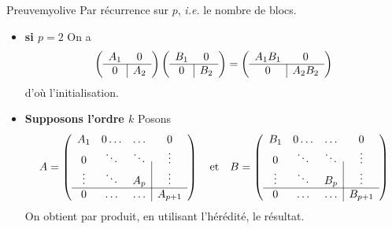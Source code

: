     \begin{demo}{Preuve}{myolive}
        Par récurrence sur $p$, \textit{i.e.} le nombre de blocs.
        \begin{itemize}
            \item \textbf{si $p = 2$} \quad On a 
            \[ \left( \begin{array}{c | c}
                A_1 & 0 \\
                \hline 
                0 & A_2
            \end{array} \right)\left( \begin{array}{c | c}
                B_1 & 0 \\
                \hline 
                0 & B_2
            \end{array} \right)  = \left( \begin{array}{c | c}
                A_1 B_1 & 0 \\
                \hline 
                0 & A_2 B_2
            \end{array} \right) \]   
            d’où l’initialisation.
            \item \textbf{Supposons l’ordre $k$} \quad Posons 
            \[ A =  \left( \begin{array}{c c c | c}
                A_1 & 0 \ldots & \ldots & 0 \\
                0 & \ddots & \ddots & \vdots \\
                \vdots & \ddots & A_p & \vdots \\
                \hline 
                0 & \ldots & \ldots  & A_{p+1}
            \end{array} \right) \quad \text{et} \quad B = \left( \begin{array}{c c c | c}
                B_1 & 0 \ldots & \ldots & 0 \\
                0 & \ddots & \ddots & \vdots \\
                \vdots & \ddots & B_p & \vdots \\
                \hline 
                0 & \ldots & \ldots  & B_{p+1}
            \end{array} \right) \]    
            On obtient par produit, en utilisant l’hérédité, le résultat.
        \end{itemize}
    \end{demo}

